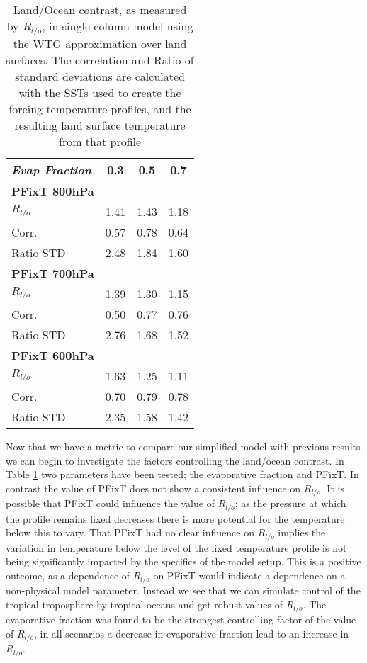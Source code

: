 \begin{center}
	\begin{table}[ht]
		\caption{Land/Ocean contrast, as measured by $R_{l/o}$, in single column 
		model using the WTG approximation over land surfaces. The correlation 
	and Ratio of standard deviations are calculated with the SSTs used to create 
the forcing temperature profiles, and the resulting land surface temperature  
from that profile}

		\label{tab:scmrlo}
		\scriptsize
	\begin{tabular}{ l  c  c  c }
		\textit{Evap Fraction}		& 0.3   & 0.5  & 0.7 \\ \hline
		\textbf{PFixT 800hPa}\\%
		$R_{l/o}$  							& 1.41  & 1.43 & 1.18\\ %
	Corr.							& 0.57  & 0.78 & 0.64\\ %
	Ratio STD           			& 2.48  & 1.84 & 1.60\\ \hline
		\textbf{PFixT 700hPa}\\%
		$R_{l/o}$  							& 1.39  & 1.30 & 1.15\\ %
	Corr.							& 0.50  & 0.77 & 0.76\\ %
	Ratio STD           			& 2.76  & 1.68 & 1.52\\ \hline
		\textbf{PFixT 600hPa}\\%
		$R_{l/o}$  							& 1.63  & 1.25 & 1.11\\ %
	Corr.							& 0.70  & 0.79 & 0.78\\ %
	Ratio STD           			& 2.35  & 1.58 & 1.42\\ \hline
	\end{tabular}
	\end{table}
\end{center}

Now that we have a metric to compare our simplified model with previous results 
we can begin to investigate the factors controlling the land/ocean contrast. In 
Table \ref{tab:scmrlo} two parameters have been tested; the evaporative fraction 
and PFixT. In contrast the value of PFixT does not show a consistent influence 
on $R_{l/o}$. It is possible that PFixT could influence the value of $R_{l/o}$; 
as the pressure at which the profile remains fixed decreases there is more 
potential for the temperature below this to vary.  That PFixT had no clear 
influence on $R_{l/o}$ implies the variation in temperature below the level of 
the fixed temperature profile is not being significantly impacted by the 
specifics of the model setup.  This is a positive outcome, as a dependence of 
$R_{l/o}$ on PFixT would indicate a dependence on a non-physical model 
parameter. Instead we see that we can simulate control of the tropical 
troposphere by tropical oceans and get robust values of $R_{l/o}$.
The evaporative fraction was found to be the strongest controlling factor of the 
value of $R_{l/o}$, in all scenarios a decrease in evaporative fraction lead to 
an increase in $R_{l/o}$.  


